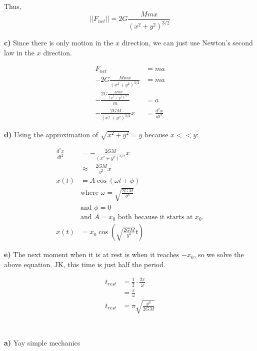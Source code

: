 \documentclass{article}
\begin{document}
Thus,
$$
||F_{net}|| = 2G\frac{Mm x}{(x^2+y^2)^{3/2}}
$$

\vspace{1cm}
\large\textbf{c)} Since there is only motion in the $x$ direction, we can just use Newton's second law in the $x$ direction.

\begin{align*}
    F_{net} &= ma \\
    -2G\frac{Mm x}{(x^2+y^2)^{3/2}} &= ma \\
    -\frac{2G\frac{Mm x}{(x^2+y^2)^{3/2}}}{m} &= a\\
    -\frac{2GM}{(x^2+y^2)^{3/2}}x &= \frac{d^2x}{dt^2}
\end{align*}

\vspace{1cm}
\large\textbf{d)} Using the approximation of $\sqrt{x^2+y^2}=y$ because $x<<y$:

\begin{align*}
    \frac{d^2 x}{dt^2} &= -\frac{2GM}{({x^2+y^2})^{3/2}}x \\
    &\approx -\frac{2GM}{y^3}x \\
    x(t) &= A\cos(\omega t + \phi) \\ 
    &\text{where } \omega = \sqrt{\frac{2GM}{y^3}}\\
    &\text{and } \phi = 0 \\
    &\text{and } A = x_0 \text{ both because it starts at } x_0.\\
    x(t) &= x_0\cos\left(\sqrt{\frac{2GM}{y^3}}t\right)
\end{align*}

\vspace{1cm}
\large\textbf{e)} The next moment when it is at rest is when it reaches $-x_0$, so we solve the above equation. JK, this time is just half the period.

\begin{align*}
    t_{rest} &= \frac{1}{2}\cdot\frac{2\pi}{\omega} \\
    &= \frac{\pi}{\omega} \\
    t_{rest} &= \pi\sqrt{\frac{y^3}{2GM}} \\
\end{align*}

\newpage
\section{}

\vspace{1cm}
\large\textbf{a)} Yay simple mechanics
\end{document}
